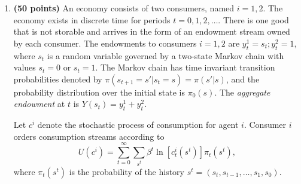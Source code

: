 \documentclass[12pt, oneside]{article}
\begin{document}
\begin{enumerate}
\begin{enumerate}
\item \textbf{(5 points)} Please describe the law of motion of the state, as you have defined it, under the firm's optimal decision rule.

Under the firm's optimal decision, the states follows the following rule
\[ x_{t+1} = (A-BF) x_t + C \epsilon_{t+1} \]

\item \textbf{(8 points)} Please state conditions on the solution of the firm's  problem that are sufficient to imply that  $x_t \equiv \left [ \begin{array}{c} z_t \\ I_t \end{array} \right ] $ converges  to a normally distributed random vector $x_\infty \sim {\cal N}(\mu, \Omega)$ as $t \rightarrow + \infty$.

Let $\tilde{x} \equiv x(2:n+2)$, i.e. state other than constant 1. Let $\tilde{A}$ denote the matrix $A-BF$ after getting rid of the first row and first column. The sufficient condition for $\tilde{x}_t$ to be stationary is that all of the eigenvalues of matrix $\tilde{A}$ are strictly less than 1 in modulus. (I think to guarantee $x_t$ converges from any initial value of $x_0$, we need to rule out any cyclical feature in $A_{22}$ and $C_2$ matrices. )

\item \textbf{(7 points)} Please give formulas for $\mu$ and $\Omega $ in terms of the firm's objective and its constraints.

From stationarity and distribution of $\epsilon$ we have 
\[ \mu = (A-BF) \mu \]
\[ \Omega = (A-BF)\Omega(A-BF)' + CC' \]
\end{enumerate}

\item \textbf{(50 points)}  An economy consists of two consumers, named $i=1,2$.
The economy exists in discrete time for periods $t =0, 1, 2, \ldots$.
There is one good that is not storable and arrives in the form of an endowment stream owned by each consumer.
The endowments to consumers $i=1,2$ are $ y_t^1 = s_t;  y_t^2  = 1,$
where $s_t$ is a random variable governed by a two-state Markov
chain with values $s_t =  0$ or  $s_t  =  1 $.
The Markov chain  has time invariant transition probabilities
denoted by $\pi(s_{t+1} = s'| s_t = s) = \pi(s'|s)$, and the
probability distribution over the initial  state is $\pi_0(s)$.
The {\it aggregate endowment} at $t$ is $Y(s_t) = y_t^1 + y_t^2$.

Let $c^i$ denote the stochastic process of consumption for agent $i$. Consumer $i$ orders consumption streams according to
$$ U(c^i)= \sum_{t=0}^\infty \sum_{s^t}  \beta^t \ln [c_t^i(s^t)]
 \pi_t (s^t),  $$
where $\pi_t(s^t)$ is the probability of the history $s^t = (s_t, s_{t-1},  \ldots , s_1,  s_0)$.


\end{enumerate}
\end{document}
